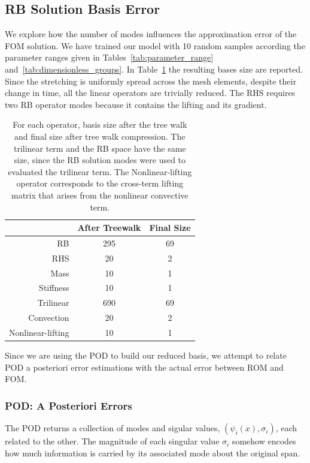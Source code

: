 \documentclass[../../thesis.tex]{subfiles}
\begin{document}
\newpage
\subsection{RB Solution Basis Error}
\label{sec:hrom_results_reduced_basis}
We explore how the number of modes influences the approximation error of the FOM solution.
We have trained our model with 10 random samples according the parameter ranges given in
Tables~\ref{tab:parameter_range} and~\ref{tab:dimensionless_groups}.  
In Table~\ref{tab:uniform_stretching_basis_size} the resulting bases size are reported.
Since the stretching is uniformly spread across the mesh elements, 
despite their change in time,
all the linear operators are trivially reduced.
The RHS requires two RB operator modes because it contains the lifting and its gradient.
\begin{table}[!h]
    \caption{For each operator,
    basis size after the tree walk and final size after tree walk compression.
    The trilinear term and the RB space have the same size, 
    since the RB solution modes were used to evaluated the trilinear term.
    The Nonlinear-lifting operator corresponds to the cross-term lifting matrix
    that arises from the nonlinear convective term.}
    \centering
    \begin{tabular}{@{}rcc@{}}
    \toprule
                      & After Treewalk & Final Size \\ \midrule
    RB                & 295            & 69                \\
    RHS               & 20             & 2                 \\
    Mass              & 10             & 1                 \\
    Stiffness         & 10             & 1                 \\
    Trilinear         & 690            & 69                \\
    Convection        & 20             & 2                 \\
    Nonlinear-lifting & 10             & 1                 \\ \bottomrule
    \end{tabular}
    \label{tab:uniform_stretching_basis_size}
\end{table}
Since we are using the POD to build our reduced basis, 
we attempt to relate POD a posteriori error estimations with 
the actual error between ROM and FOM.

\subsubsection{POD: A Posteriori Errors}
The POD returns a collection of modes and sigular values, 
$(\psi_i(x), \sigma_i)$,
each related to the other.
The magnitude of each singular value $\sigma_i$ somehow encodes 
how much information is carried by its associated mode about the original span.
\end{document}
